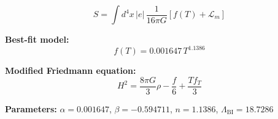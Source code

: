 
\begin{equation}
  S = \int d^4x \, |e| \, \frac{1}{16\pi G} \left[ f(T) + \mathcal{L}_m \right]
\end{equation}

\textbf{Best-fit model:}
\begin{equation}
  f(T) = 0.001647 \, T^{1.1386}
\end{equation}

\textbf{Modified Friedmann equation:}
\begin{equation}
  H^2 = \frac{8\pi G}{3} \rho - \frac{f}{6} + \frac{T f_T}{3}
\end{equation}

\textbf{Parameters:}
$\alpha = 0.001647$, \quad
$\beta = -0.594711$, \quad
$n = 1.1386$, \quad
$\Lambda_{\text{BI}} = 18.7286$